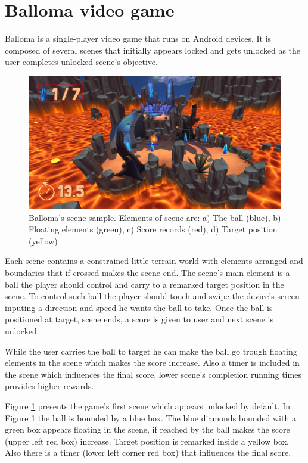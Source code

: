 \documentclass[peerreview,onecolumn]{IEEEtran}
\begin{document}
\section{Balloma video game}
  
   Balloma is a single-player video game that runs on Android devices. It is composed of several scenes that initially appears locked and gets unlocked as the user completes unlocked scene's objective. 
   
   \begin{figure}[!h]
		\centering
		\includegraphics[scale=0.3]{img/balloma_scene.jpg} 
		\caption{Balloma's scene sample. Elements of scene are: a) The ball (blue), b) Floating elements (green), c) Score records (red), d) Target position (yellow)}
		\label{fig_scene}
	\end{figure}
   
   Each scene contains a constrained little terrain world with elements arranged and boundaries that if crossed makes the scene end. The scene's main element is a ball the player should control and carry to a remarked target position in the scene. To control such ball the player should touch and swipe the device's screen inputing a direction and speed he wants the ball to take. Once the ball is positioned at target, scene ends, a score is given to user and next scene is unlocked. 
   
   
   
   While the user carries the ball to target he can make the ball go trough floating elements in the scene which makes the score increase. Also a timer is included in the scene which influences the final score, lower scene's completion running times provides higher rewards.
   
   Figure \ref{fig_scene} presents the game's first scene which appears unlocked by default. In Figure \ref{fig_scene} the ball is bounded by a blue box. The blue diamonds bounded with a green box appears floating in the scene, if reached by the ball makes the score (upper left red box) increase. Target position is remarked inside a yellow box. Also there is a timer (lower left corner red box) that influences the final score.
   
\end{document}
